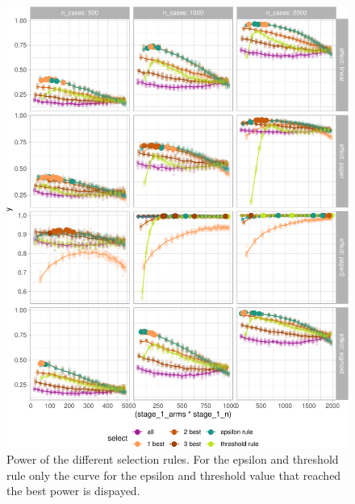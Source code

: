 \documentclass[bimj,fleqn]{w-art}
\theoremstyle{plain}
\theoremstyle{definition}
\begin{document}
\begin{figure}[htb]
\centering
\includegraphics[width=\linewidth]{generated/figures/plot_allbest.pdf}
\caption{Power of the different selection rules. For the epsilon and threshold rule only the curve for the epsilon and threshold value that reached the best power is dispayed.}
\label{fig:plot_allbest}
\end{figure}
\end{document}
